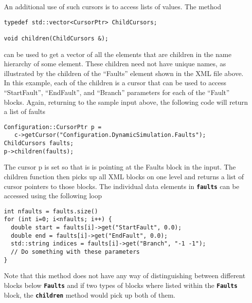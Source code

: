 An additional use of such cursors is to access lists of values. The method

{
\color{red}
\begin{Verbatim}[fontseries=b]
typedef std::vector<CursorPtr> ChildCursors;

void children(ChildCursors &);
\end{Verbatim}
}

can be used to get a vector of all the elements that are children in the name
hierarchy of some element. These children need not have unique names, as
illustrated by the children of the ``Faults'' element shown in the XML file above. In this example, each of the children is a cursor that can be used to access ``StartFault'', ``EndFault'', and ``Branch'' parameters for each of the ``Fault'' blocks. Again, returning to the sample input above, the following code will return a list of faults

{
\color{red}
\begin{Verbatim}[fontseries=b]
Configuration::CursorPtr p = 
   c->getCursor("Configuration.DynamicSimulation.Faults");
ChildCursors faults;
p->children(faults);
\end{Verbatim}
}

The cursor p is set so that is is pointing at the Faults block in the input. The children function then picks up all XML blocks on one level and returns a list of cursor pointers to those blocks. The individual data elements in \texttt{\textbf{faults}} can be accessed using the following loop

{
\color{red}
\begin{Verbatim}[fontseries=b]
int nfaults = faults.size()
for (int i=0; i<nfaults; i++) {
  double start = faults[i]->get("StartFault", 0.0);
  double end = faults[i]->get("EndFault", 0.0);
  std::string indices = faults[i]->get("Branch", "-1 -1");
  // Do something with these parameters
}
\end{Verbatim}
}

Note that this method does not have any way of distinguishing between different blocks below \texttt{\textbf{Faults}} and if two types of blocks where listed within the \texttt{\textbf{Faults}} block, the \texttt{\textbf{children}} method would pick up both of them.
